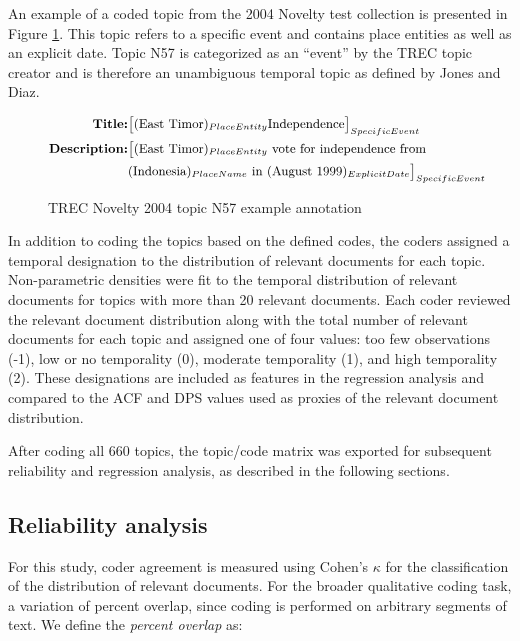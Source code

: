 \documentclass[runningheads,a4paper]{llncs}
\begin{document}
An example of a coded topic from the 2004 Novelty test collection is presented in Figure \ref{fig.example}.  This topic refers to a specific event and contains place entities as well as an explicit date.  Topic N57 is categorized as an ``event'' by the TREC topic creator and is therefore an unambiguous temporal topic as defined by Jones and Diaz.

\begin{figure}
\begin{equation*}
\small
\begin{split}
\mbox{\bf{Title}:} & \big[(\mbox{East Timor})_{PlaceEntity} \mbox{Independence}\big]_{SpecificEvent} \\
\mbox{\bf{Description}:} & \big[  (\mbox{East Timor})_{PlaceEntity} \mbox{ vote for independence from } \\
	& (\mbox{Indonesia})_{PlaceName} \mbox{ in } (\mbox{August 1999})_{ExplicitDate}\big]_{SpecificEvent}
\end{split}
\end{equation*}
\caption{TREC Novelty 2004 topic N57 example annotation}
\label{fig.example}
\end{figure}

In addition to coding the topics based on the defined codes, the coders assigned a temporal designation to the distribution of relevant documents for each topic. Non-parametric densities were fit to the temporal distribution of relevant documents for topics with more than 20 relevant documents. Each coder reviewed the relevant document distribution along with the total number of relevant documents for each topic and assigned one of four values:  too few observations (-1), low or no temporality (0), moderate temporality (1), and high temporality (2). These designations are included as features in the regression analysis and compared to the ACF and DPS values used as proxies of the relevant document distribution.
 
After coding all 660 topics, the topic/code matrix was exported for subsequent reliability and regression analysis, as described in the following sections. 

\subsection{Reliability analysis}

For this study, coder agreement is measured using Cohen's $\kappa$ for the classification of the distribution of relevant documents. For the broader qualitative coding task, a variation of percent overlap, since coding is performed on arbitrary segments of text. We define the \emph{percent overlap} as:
\end{document}
